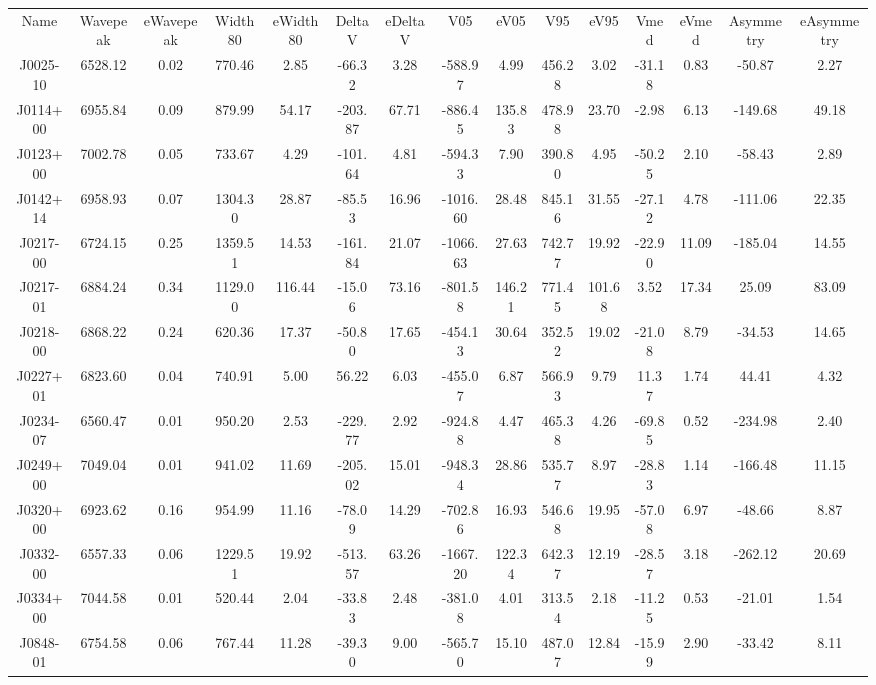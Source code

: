 \begin{table}
\begin{tabular}{ccccccccccccccc}
Name & Wavepeak & eWavepeak & Width80 & eWidth80 & DeltaV & eDeltaV & V05 & eV05 & V95 & eV95 & Vmed & eVmed & Asymmetry & eAsymmetry \\
J0025-10 & 6528.12 & 0.02 & 770.46 & 2.85 & -66.32 & 3.28 & -588.97 & 4.99 & 456.28 & 3.02 & -31.18 & 0.83 & -50.87 & 2.27 \\
J0114+00 & 6955.84 & 0.09 & 879.99 & 54.17 & -203.87 & 67.71 & -886.45 & 135.83 & 478.98 & 23.70 & -2.98 & 6.13 & -149.68 & 49.18 \\
J0123+00 & 7002.78 & 0.05 & 733.67 & 4.29 & -101.64 & 4.81 & -594.33 & 7.90 & 390.80 & 4.95 & -50.25 & 2.10 & -58.43 & 2.89 \\
J0142+14 & 6958.93 & 0.07 & 1304.30 & 28.87 & -85.53 & 16.96 & -1016.60 & 28.48 & 845.16 & 31.55 & -27.12 & 4.78 & -111.06 & 22.35 \\
J0217-00 & 6724.15 & 0.25 & 1359.51 & 14.53 & -161.84 & 21.07 & -1066.63 & 27.63 & 742.77 & 19.92 & -22.90 & 11.09 & -185.04 & 14.55 \\
J0217-01 & 6884.24 & 0.34 & 1129.00 & 116.44 & -15.06 & 73.16 & -801.58 & 146.21 & 771.45 & 101.68 & 3.52 & 17.34 & 25.09 & 83.09 \\
J0218-00 & 6868.22 & 0.24 & 620.36 & 17.37 & -50.80 & 17.65 & -454.13 & 30.64 & 352.52 & 19.02 & -21.08 & 8.79 & -34.53 & 14.65 \\
J0227+01 & 6823.60 & 0.04 & 740.91 & 5.00 & 56.22 & 6.03 & -455.07 & 6.87 & 566.93 & 9.79 & 11.37 & 1.74 & 44.41 & 4.32 \\
J0234-07 & 6560.47 & 0.01 & 950.20 & 2.53 & -229.77 & 2.92 & -924.88 & 4.47 & 465.38 & 4.26 & -69.85 & 0.52 & -234.98 & 2.40 \\
J0249+00 & 7049.04 & 0.01 & 941.02 & 11.69 & -205.02 & 15.01 & -948.34 & 28.86 & 535.77 & 8.97 & -28.83 & 1.14 & -166.48 & 11.15 \\
J0320+00 & 6923.62 & 0.16 & 954.99 & 11.16 & -78.09 & 14.29 & -702.86 & 16.93 & 546.68 & 19.95 & -57.08 & 6.97 & -48.66 & 8.87 \\
J0332-00 & 6557.33 & 0.06 & 1229.51 & 19.92 & -513.57 & 63.26 & -1667.20 & 122.34 & 642.37 & 12.19 & -28.57 & 3.18 & -262.12 & 20.69 \\
J0334+00 & 7044.58 & 0.01 & 520.44 & 2.04 & -33.83 & 2.48 & -381.08 & 4.01 & 313.54 & 2.18 & -11.25 & 0.53 & -21.01 & 1.54 \\
J0848-01 & 6754.58 & 0.06 & 767.44 & 11.28 & -39.30 & 9.00 & -565.70 & 15.10 & 487.07 & 12.84 & -15.99 & 2.90 & -33.42 & 8.11 \\

\end{tabular}
\end{table}
